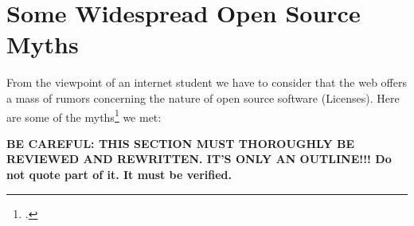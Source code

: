 %
%
%
%

%




\section{Some Widespread Open Source Myths}

From the viewpoint of an internet student we have to consider that the web
offers a mass of rumors concerning the nature of open source software
(Licenses). Here are some of the myths\footcite[At least one time even a
scientific legally discussing book is talking about the \enquote{myth around open
source licenses} -- although only as part of  the title: cf][1ff,
especially 209ff]{GuiOvd2006a} we met:
 
\textbf{BE CAREFUL: THIS SECTION MUST THOROUGHLY BE REVIEWED AND REWRITTEN. 
IT'S ONLY AN OUTLINE!!! Do not quote part of it. It must be verified.}


